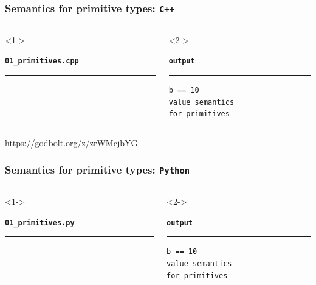 \documentclass[aspectratio=169]{beamer}
\newcommand{\cpp}[1]{\texttt{\textbf{\textcolor{clCodeBlue}{#1}}}}
\begin{document}
\begin{frame}[fragile]
\frametitle{Semantics for primitive types: \cpp{C++}}
\begin{columns}[T]
  \begin{column}{0.6\textwidth}<1->
    {\color[HTML]{cb4b16}
    \texttt{\textbf{01\_primitives.cpp}}\vspace{-9pt}
    \rule{\linewidth}{2pt}}%
    {\fontsize{8}{6} }%
    \vspace{-12pt}{\color[HTML]{cb4b16}\rule{\linewidth}{2pt}}%
  \end{column}
  \begin{column}{0.3\textwidth}<2->
    {\color[HTML]{002b36}
    \texttt{\textbf{output}}\vspace{-9pt}
    \rule{\linewidth}{2pt}}%
    {\fontsize{8}{6} \begin{lstlisting}[showstringspaces=false]
b == 10
value semantics
for primitives
    \end{lstlisting}
    }
    \vspace{-12pt}{\color[HTML]{002b36}\rule{\linewidth}{2pt}}%
  \end{column}
\end{columns}
\pause{}
\begin{center}\url{https://godbolt.org/z/zrWMcjbYG}\end{center}
\end{frame}

\begin{frame}[fragile]
\frametitle{Semantics for primitive types: \cpp{Python}}
\begin{columns}[T]
  \begin{column}{0.7\textwidth}<1->
    {\color[HTML]{b58900}
    \texttt{\textbf{01\_primitives.py}}\vspace{-9pt}
    \rule{\linewidth}{2pt}}%
    {\fontsize{8}{6} }%
    \vspace{-12pt}{\color[HTML]{b58900}\rule{\linewidth}{2pt}}%
  \end{column}
  \begin{column}{0.25\textwidth}<2->
    {\color[HTML]{002b36}
    \texttt{\textbf{output}}\vspace{-9pt}
    \rule{\linewidth}{2pt}}%
    {\fontsize{8}{6} \begin{lstlisting}[showstringspaces=false]
b == 10
value semantics
for primitives
    \end{lstlisting}
    }
    \vspace{-12pt}{\color[HTML]{002b36}\rule{\linewidth}{2pt}}%
  \end{column}
\end{columns}
\end{frame}
\end{document}
